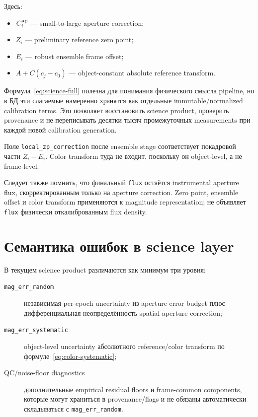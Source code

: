 Здесь:
\begin{itemize}
  \item $C^{\rm ap}_i$ --- small-to-large aperture correction;
  \item $Z_i$ --- preliminary reference zero point;
  \item $E_i$ --- robust ensemble frame offset;
  \item $A+C(c_j-c_0)$ --- object-constant absolute reference transform.
\end{itemize}

Формула~\eqref{eq:science-full} полезна для понимания физического смысла pipeline, но в БД эти слагаемые намеренно хранятся как отдельные immutable/normalized calibration terms. Это позволяет восстановить science product, проверить provenance и не переписывать десятки тысяч промежуточных measurements при каждой новой calibration generation.

Поле \texttt{local\_zp\_correction} после ensemble stage соответствует покадровой части $Z_i-E_i$. Color transform туда не входит, поскольку он object-level, а не frame-level.

Следует также помнить, что финальный \texttt{flux} остаётся instrumental aperture flux, скорректированным только на aperture correction. Zero point, ensemble offset и color transform применяются к magnitude representation; \program{} не объявляет \texttt{flux} физически откалиброванным flux density.

\section{Семантика ошибок в science layer}

В текущем science product различаются как минимум три уровня:

\begin{description}
  \item[\texttt{mag\_err\_random}] независимая per-epoch uncertainty из aperture error budget плюс дифференциальная неопределённость spatial aperture correction;
  \item[\texttt{mag\_err\_systematic}] object-level uncertainty абсолютного reference/color transform по формуле~\eqref{eq:color-systematic};
  \item[QC/noise-floor diagnostics] дополнительные empirical residual floors и frame-common components, которые могут храниться в provenance/flags и не обязаны автоматически складываться с \texttt{mag\_err\_random}.
\end{description}

